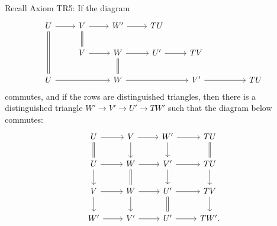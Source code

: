\documentclass[12pt]{article}
\theoremstyle{remark}
\theoremstyle{definition}
\begin{document}
Recall Axiom TR5: If the diagram 
$$
\begin{tikzcd}
U\ar[equal]{dd}\ar{r}&V\ar[equal]{d}\ar{r}&W'\ar{r}&TU\\
&V\ar{r}&W\ar[equal]{d}\ar{r}&U'\ar{r}&TV\\
U\ar{rr}&&W\ar{rr}&&V'\ar{rr}&&TU
\end{tikzcd}
$$
commutes, and if the rows are distinguished triangles, then there is a distinguished triangle $W'\to V'\to U'\to TW'$ such that the diagram below commutes:
$$
\begin{tikzcd}
U\ar{r}\ar[equal]{d}&V\ar{d}\ar{r}&W'\ar{d}\ar{r}&TU\ar[equal]{d}\\
U\ar{d}\ar{r}&W\ar{r}\ar[equal]{d}&V'\ar{d}\ar{r}&TU\ar{d}\\
V\ar{d}\ar{r}&W\ar{d}\ar{r}&U'\ar{r}\ar[equal]{d}&TV\ar{d}\\
W'\ar{r}&V'\ar{r}&U'\ar{r}&TW'.
\end{tikzcd}
$$
\end{document}
